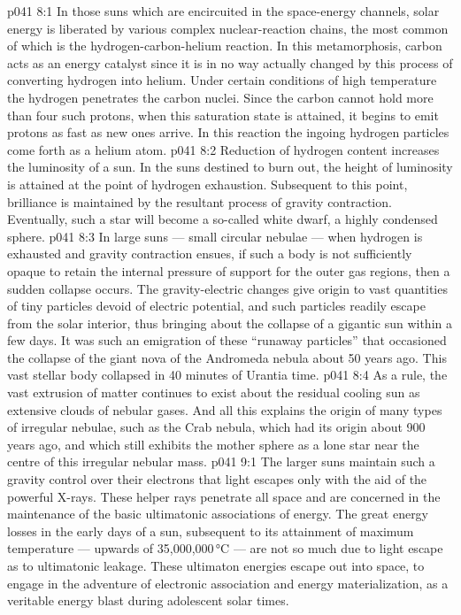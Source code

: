 \vs p041 8:1 In those suns which are encircuited in the space\hyp{}energy channels, solar energy is liberated by various complex nuclear\hyp{}reaction chains, the most common of which is the hydrogen\hyp{}carbon\hyp{}helium reaction. In this metamorphosis, carbon acts as an energy catalyst since it is in no way actually changed by this process of converting hydrogen into helium. Under certain conditions of high temperature the hydrogen penetrates the carbon nuclei. Since the carbon cannot hold more than four such protons, when this saturation state is attained, it begins to emit protons as fast as new ones arrive. In this reaction the ingoing hydrogen particles come forth as a helium atom.
\vs p041 8:2 \pc Reduction of hydrogen content increases the luminosity of a sun. In the suns destined to burn out, the height of luminosity is attained at the point of hydrogen exhaustion. Subsequent to this point, brilliance is maintained by the resultant process of gravity contraction. Eventually, such a star will become a so\hyp{}called white dwarf, a highly condensed sphere.
\vs p041 8:3 \pc In large suns --- small circular nebulae --- when hydrogen is exhausted and gravity contraction ensues, if such a body is not sufficiently opaque to retain the internal pressure of support for the outer gas regions, then a sudden collapse occurs. The gravity\hyp{}electric changes give origin to vast quantities of tiny particles devoid of electric potential, and such particles readily escape from the solar interior, thus bringing about the collapse of a gigantic sun within a few days. It was such an emigration of these “runaway particles” that occasioned the collapse of the giant nova of the Andromeda nebula about 50 years ago. This vast stellar body collapsed in 40 minutes of Urantia time.
\vs p041 8:4 As a rule, the vast extrusion of matter continues to exist about the residual cooling sun as extensive clouds of nebular gases. And all this explains the origin of many types of irregular nebulae, such as the Crab nebula, which had its origin about 900 years ago, and which still exhibits the mother sphere as a lone star near the centre of this irregular nebular mass.
\vs p041 9:1 The larger suns maintain such a gravity control over their electrons that light escapes only with the aid of the powerful X\hyp{}rays. These helper rays penetrate all space and are concerned in the maintenance of the basic ultimatonic associations of energy. The great energy losses in the early days of a sun, subsequent to its attainment of maximum temperature --- upwards of 35,000,000\,°C --- are not so much due to light escape as to ultimatonic leakage. These ultimaton energies escape out into space, to engage in the adventure of electronic association and energy materialization, as a veritable energy blast during adolescent solar times.
